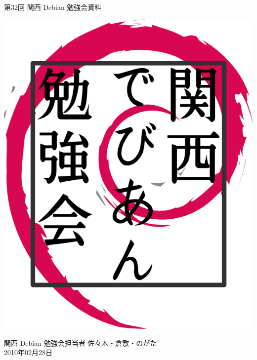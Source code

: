 \documentclass[mingoth,a4paper]{jsarticle}
\newcommand{\debmtgyear}{2010}
\newcommand{\debmtgdate}{28}
\newcommand{\debmtgmonth}{02}
\newcommand{\debmtgnumber}{32}
\begin{document}
\begin{titlepage}


 第\debmtgnumber{}回 関西 Debian 勉強会資料

\vspace{2cm}

\begin{center}
\includegraphics{image200802/kansaidebianlogo.png}
\end{center}

\begin{flushright}
\hfill{}関西 Debian 勉強会担当者 佐々木・倉敷・のがた \\
\hfill{}\debmtgyear{}年\debmtgmonth{}月\debmtgdate{}日
\end{flushright}

\thispagestyle{empty}
\end{titlepage}


\subsection*{}%
 
\end{document}
